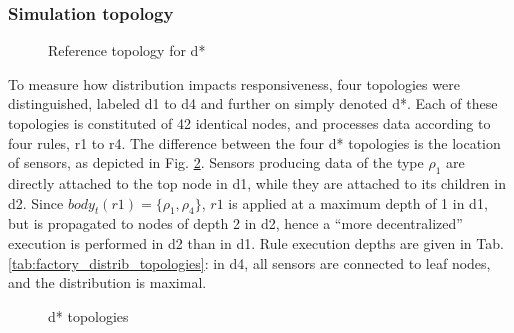 \documentclass{iosart2c}
\begin{document}
\subsubsection{Simulation topology}

\begin{figure}
	\centering
	\caption{Reference topology for d*}
	\label{fig:factory_distrib_topologies}
	\scalebox{0.95}{
		
	}
\end{figure}

\begin{table}
	\centering
	\caption{Machines hosts for distribution experiments}
	\label{tab:distrib_hosts}
\end{table}

To measure how distribution impacts responsiveness, four topologies were distinguished, labeled d1 to d4 and further on simply denoted d*. Each of these topologies is constituted of 42 identical nodes, and processes data according to four rules, r1 to r4.
The difference between the four d* topologies is the location of sensors, as depicted in Fig. \ref{fig:dstar}. 
Sensors producing data of the type $\rho_{1}$ are directly attached to the top node in d1, while they are attached to its children in d2. 
Since $body_t(r1)=\{\rho_{1}, \rho_{4}\}$, $r1$ is applied at a maximum depth of 1 in d1, but is propagated to nodes of depth 2 in d2, hence a ``more decentralized'' execution is performed in d2 than in d1.
Rule execution depths are given in Tab. \ref{tab:factory_distrib_topologies}: in d4, all sensors are connected to leaf nodes, and the distribution is maximal.

\begin{figure}
	\centering
	\caption{d* topologies}
	\label{fig:dstar}
	\scalebox{0.75}{
		
	}
	
	\centering
	\scalebox{0.75}{
		
	}
	
%	
\end{figure}
\end{document}
